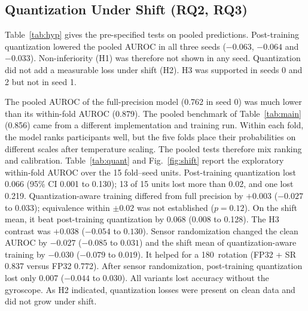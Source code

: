 \documentclass[journal,twoside,web]{ieeecolor}
\begin{document}
\subsection{Quantization Under Shift (RQ2, RQ3)}
Table~\ref{tab:hyp} gives the pre-specified tests on pooled predictions. Post-training quantization lowered the pooled AUROC in all three seeds ($-0.063$, $-0.064$ and $-0.033$). Non-inferiority (H1) was therefore not shown in any seed. Quantization did not add a measurable loss under shift (H2). H3 was supported in seeds 0 and 2 but not in seed 1.

The pooled AUROC of the full-precision model (0.762 in seed 0) was much lower than its within-fold AUROC (0.879). The pooled benchmark of Table~\ref{tab:main} (0.856) came from a different implementation and training run. Within each fold, the model ranks participants well, but the five folds place their probabilities on different scales after temperature scaling. The pooled tests therefore mix ranking and calibration. Table~\ref{tab:quant} and Fig.~\ref{fig:shift} report the exploratory within-fold AUROC over the 15 fold--seed units. Post-training quantization lost 0.066 (95\% CI 0.001 to 0.130); 13 of 15 units lost more than 0.02, and one lost 0.219. Quantization-aware training differed from full precision by $+0.003$ ($-0.027$ to $0.033$); equivalence within $\pm0.02$ was not established ($p=0.12$). On the shift mean, it beat post-training quantization by 0.068 (0.008 to 0.128). The H3 contrast was $+0.038$ ($-0.054$ to $0.130$). Sensor randomization changed the clean AUROC by $-0.027$ ($-0.085$ to $0.031$) and the shift mean of quantization-aware training by $-0.030$ ($-0.079$ to $0.019$). It helped for a 180\textdegree\ rotation (FP32 + SR 0.837 versus FP32 0.772). After sensor randomization, post-training quantization lost only 0.007 ($-0.044$ to $0.030$). All variants lost accuracy without the gyroscope. As H2 indicated, quantization losses were present on clean data and did not grow under shift.
\end{document}
